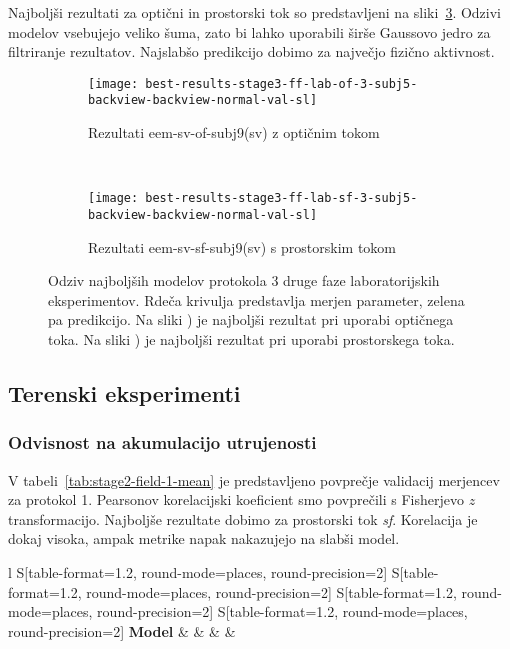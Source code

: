 Najboljši rezultati za optični in prostorski tok so predstavljeni na sliki~\ref{fig:lab-3}. Odzivi modelov vsebujejo veliko šuma, zato bi lahko uporabili širše Gaussovo jedro za filtriranje rezultatov. Najslabšo predikcijo dobimo za največjo fizično aktivnost.

\begin{figure}[!htbp]
	\centering
	\begin{subfigure}[t]{0.45\columnwidth}
		\texttt{[image: best-results-stage3-ff-lab-of-3-subj5-backview-backview-normal-val-sl]}
		\caption{Rezultati eem-sv-of-subj9(sv) z optičnim tokom}
		\label{fig:lab-of-3}
	\end{subfigure}
	~
	\begin{subfigure}[t]{0.45\columnwidth}
		\texttt{[image: best-results-stage3-ff-lab-sf-3-subj5-backview-backview-normal-val-sl]}
		\caption{Rezultati eem-sv-sf-subj9(sv) s prostorskim tokom}
		\label{fig:lab-sf-3}
	\end{subfigure}
	\caption[Odziv SUBJ9 modelov protokola 3 druge faze laboratorijskih eksperimentov]{Odziv najboljših modelov protokola 3 druge faze laboratorijskih eksperimentov. Rdeča krivulja predstavlja merjen parameter, zelena pa predikcijo. Na sliki ) je najboljši rezultat pri uporabi optičnega toka. Na sliki ) je najboljši rezultat pri uporabi prostorskega toka.}
	\label{fig:lab-3}
\end{figure}

\subsection{Terenski eksperimenti}
\subsubsection{Odvisnost na akumulacijo utrujenosti}
V tabeli~\ref{tab:stage2-field-1-mean} je predstavljeno povprečje validacij merjencev za protokol 1. Pearsonov korelacijski koeficient \corr smo povprečili s Fisherjevo $z$ transformacijo. Najboljše rezultate dobimo za prostorski tok \textit{sf}. Korelacija je dokaj visoka, ampak metrike napak nakazujejo na slabši model.

\begin{table}[!htbp]
	\centering
	\begin{tabular}{l S[table-format=1.2, round-mode=places, round-precision=2] S[table-format=1.2, round-mode=places, round-precision=2] S[table-format=1.2, round-mode=places, round-precision=2] S[table-format=1.2, round-mode=places, round-precision=2]}
		\toprule
		\textbf{Model} & \thead{\corr} & \thead{\rae} & \thead{\rrse} & \theadm{\nsv}\\
		\midrule
		\bottomrule
	\end{tabular}
	\caption[Povprečje validacij merjencev za protokol 1 2. faze terenskih eksperimentov]{Povprečje validacij merjencev za protokol 1 druge faze terenskih eksperimentov. Pearsonov korelacijski koeficient (CORR) smo povprečili s Fisherjevo $z$ transformacijo.}
	\label{tab:stage2-field-1-mean}
\end{table}

